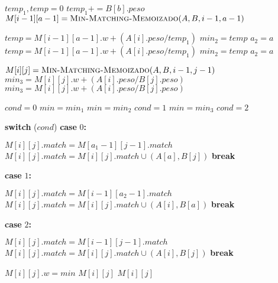 \documentclass[12pt]{article}
\makeatletter
\newcommand{\algcost}[2]{\strut\hfill\makebox[4cm][l]{#1}\makebox[0.5cm][l]{#2}}
\newcommand{\SWITCH}[1]{\STATE \textbf{switch} (#1)}
\newcommand{\CASE}[1]{\STATE \textbf{case} #1\textbf{:} \begin{ALC@g}}
\newcommand{\ENDCASE}{\end{ALC@g}}
\makeatother
\begin{document}
\begin{algorithmic}[1]
                \STATE $temp_1,temp = 0$
                    \STATE $temp_1 += B[b].peso$
                \ENDFOR
                    \STATE $M[i-1][a-1] = \textsc{Min-Matching-Memoizado}(A,B,i-1,a-1)$                                                     \algcost{$c1$}{$1$}
                    \STATE $temp = M[i-1][a-1].w + (A[i].peso/temp_1)$
                        \STATE $min_2 = temp$
                        \STATE $a_2 = a$
                    \ENDIF
                \ELSE
                    \STATE $temp = M[i-1][a-1].w + (A[i].peso/temp_1)$
                        \STATE $min_2 = temp$
                        \STATE $a_2 = a$
                    \ENDIF
                \ENDIF
            \ENDFOR
            
                \STATE $M[i][j] = \textsc{Min-Matching-Memoizado}(A,B,i-1,j-1)$
                \STATE $min_3 = M[i][j].w + (A[i].peso/B[j].peso)$
            \ELSE
                \STATE $min_3 = M[i][j].w + (A[i].peso/B[j].peso)$
            \ENDIF
            
            \STATE $cond = 0$
            \STATE $min = min_1$
                \STATE $min = min_2$
                \STATE $cond = 1$
                \STATE $min = min_3$
                \STATE $cond = 2$
            \ENDIF
            
            \SWITCH{$cond$}
            \CASE{$0$}                                                     
                \STATE $M[i][j].match = M[a_1-1][j-1].match$
                    \STATE $M[i][j].match = M[i][j].match \cup (A[a],B[j])$
                \ENDFOR
                \STATE \textbf{break}
            \ENDCASE
            \CASE{$1$}                                                     
                \STATE $M[i][j].match = M[i-1][a_2-1].match$
                    \STATE $M[i][j].match = M[i][j].match \cup (A[i],B[a])$
                \ENDFOR
                \STATE \textbf{break}
            \ENDCASE
            \CASE{$2$}                                                     
                \STATE $M[i][j].match = M[i-1][j-1].match$
                \STATE $M[i][j].match = M[i][j].match \cup (A[i],B[j])$
                \STATE \textbf{break}
            \ENDCASE
            \STATE $M[i][j].w = min$
            \RETURN $M[i][j]$
        \ELSE
            \RETURN $M[i][j]$
        \ENDIF
    \ENDIF
\end{algorithmic}
\end{document}
